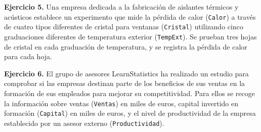 \documentclass[
]{book}
\newenvironment{Shaded}{\begin{snugshade}}{\end{snugshade}}
\newcommand{\CommentTok}[1]{\textcolor[rgb]{0.56,0.35,0.01}{\textit{#1}}}
\newcommand{\DataTypeTok}[1]{\textcolor[rgb]{0.13,0.29,0.53}{#1}}
\newcommand{\KeywordTok}[1]{\textcolor[rgb]{0.13,0.29,0.53}{\textbf{#1}}}
\newcommand{\NormalTok}[1]{#1}
\newcommand{\OperatorTok}[1]{\textcolor[rgb]{0.81,0.36,0.00}{\textbf{#1}}}
\newcommand{\StringTok}[1]{\textcolor[rgb]{0.31,0.60,0.02}{#1}}
\theoremstyle{definition}
\theoremstyle{definition}
\theoremstyle{definition}
\theoremstyle{remark}
\begin{document}
\begin{Shaded}
\end{Shaded}

\textbf{Ejercicio 5.} Una empresa dedicada a la fabricación de aislantes térmicos y acústicos establece un experimento que mide la pérdida de calor (\texttt{Calor}) a través de cuatro tipos diferentes de cristal para ventanas (\texttt{Cristal}) utilizando cinco graduaciones diferentes de temperatura exterior (\texttt{TempExt}). Se prueban tres hojas de cristal en cada graduación de temperatura, y se registra la pérdida de calor para cada hoja.

\begin{Shaded}
\end{Shaded}

\textbf{Ejercicio 6.} El grupo de asesores LearnStatistics ha realizado un estudio para comprobar si las empresas destinan parte de los beneficios de sus ventas en la formación de sus empleados para mejorar su competitividad. Para ellos se recoge la información sobre ventas (\texttt{Ventas}) en miles de euros, capital invertido en formación (\texttt{Capital}) en miles de euros, y el nivel de productividad de la empresa establecido por un asesor externo (\texttt{Productividad}).

\begin{Shaded}
\end{Shaded}
\end{document}
